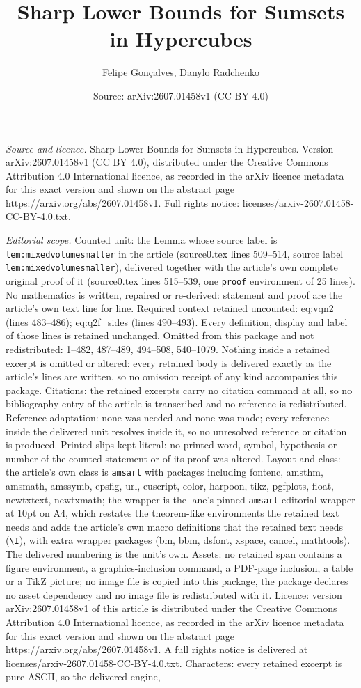 \documentclass[10pt,a4paper]{amsart}
\title[Sharp Lower Bounds for Sumsets in Hypercubes]{Sharp Lower Bounds for Sumsets in Hypercubes}
\author{Felipe Gon\c{c}alves, Danylo Radchenko}
\date{Source: arXiv:2607.01458v1 (CC BY 4.0)}
\begin{document}
\maketitle

\noindent\emph{Source and licence.} Sharp Lower Bounds for Sumsets in Hypercubes. Version arXiv:2607.01458v1 (CC BY 4.0), distributed under the Creative Commons Attribution 4.0 International licence, as recorded in the arXiv licence metadata for this exact version and shown on the abstract page https://arxiv.org/abs/2607.01458v1. Full rights notice: licenses/arxiv-2607.01458-CC-BY-4.0.txt.\par\smallskip

\noindent\textit{Editorial scope.} Counted unit: the Lemma whose source label is \texttt{lem:mixedvolumesmaller} in the article (source0.tex lines 509--514, source label \texttt{lem:mixedvolumesmaller}), delivered together with the article's own complete original proof of it (source0.tex lines 515--539, one \texttt{proof} environment of 25 lines). No mathematics is written, repaired or re-derived: statement and proof are the article's own text line for line. Required context retained uncounted: eq:vqn2 (lines 483--486); eq:q2f\_sides (lines 490--493). Every definition, display and label of those lines is retained unchanged. Omitted from this package and not redistributed: 1--482, 487--489, 494--508, 540--1079. Nothing inside a retained excerpt is omitted or altered: every retained body is delivered exactly as the article's lines are written, so no omission receipt of any kind accompanies this package. Citations: the retained excerpts carry no citation command at all, so no bibliography entry of the article is transcribed and no reference is redistributed. Reference adaptation: none was needed and none was made; every reference inside the delivered unit resolves inside it, so no unresolved reference or citation is produced. Printed slips kept literal: no printed word, symbol, hypothesis or number of the counted statement or of its proof was altered. Layout and class: the article's own class is \texttt{amsart} with packages including fontenc, amsthm, amsmath, amssymb, epsfig, url, euscript, color, harpoon, tikz, pgfplots, float, newtxtext, newtxmath; the wrapper is the lane's pinned \texttt{amsart} editorial wrapper at 10pt on A4, which restates the theorem-like environments the retained text needs and adds the article's own macro definitions that the retained text needs (\texttt{\textbackslash I}), with extra wrapper packages (bm, bbm, dsfont, xspace, cancel, mathtools). The delivered numbering is the unit's own. Assets: no retained span contains a figure environment, a graphics-inclusion command, a PDF-page inclusion, a table or a TikZ picture; no image file is copied into this package, the package declares no asset dependency and no image file is redistributed with it. Licence: version arXiv:2607.01458v1 of this article is distributed under the Creative Commons Attribution 4.0 International licence, as recorded in the arXiv licence metadata for this exact version and shown on the abstract page https://arxiv.org/abs/2607.01458v1. A full rights notice is delivered at licenses/arxiv-2607.01458-CC-BY-4.0.txt. Characters: every retained excerpt is pure ASCII, so the delivered engine, 
\end{document}
